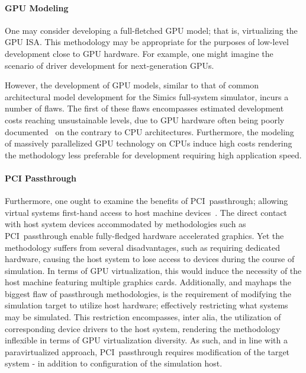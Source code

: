 \paragraph{GPU Modeling}
\label{par:backgroundandrelatedwork_graphicsvirtualization_gpumodeling}
One may consider developing a full-fletched GPU model; that is, virtualizing the GPU ISA.
This methodology may be appropriate for the purposes of low-level development close to GPU hardware.
For example, one might imagine the scenario of driver development for next-generation GPUs.

However, the development of GPU models, similar to that of common architectural model development for the Simics full-system simulator, incurs a number of flaws.
The first of these flaws encompasses estimated development costs reaching unsustainable levels, due to GPU hardware often being poorly documented~ on the contrary to CPU architectures.
Furthermore, the modeling of massively parallelized GPU technology on CPUs induce high costs rendering the methodology less preferable for development requiring high application speed.

\paragraph{PCI Passthrough}
\label{par:backgroundandrelatedwork_graphicsvirtualization_pcipassthrough}
Furthermore, one ought to examine the benefits of PCI~passthrough; allowing virtual systems first-hand access to host machine devices~.
The direct contact with host system devices accommodated by methodologies such as PCI~passthrough enable fully-fledged hardware accelerated graphics.
Yet the methodology suffers from several disadvantages, such as requiring dedicated hardware, causing the host system to lose access to devices during the course of simulation.
In terms of GPU virtualization, this would induce the necessity of the host machine featuring multiple graphics cards.
Additionally, and mayhaps the biggest flaw of passthrough methodologies, is the requirement of modifying the simulation target to utilize host hardware; effectively restricting what systems may be simulated.
This restriction encompasses, inter alia, the utilization of corresponding device drivers to the host system, rendering the methodology inflexible in terms of GPU virtualization diversity.
As such, and in line with a paravirtualized approach, PCI~passthrough requires modification of the target system - in addition to configuration of the simulation host.

